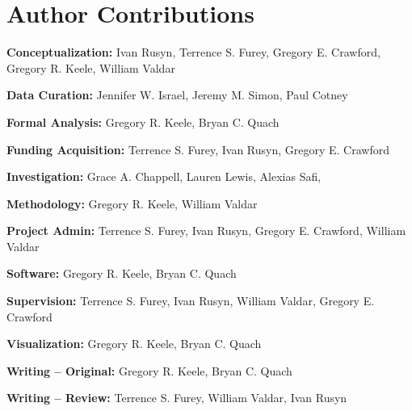 \documentclass[10pt,letterpaper]{article}
\begin{document}
\section*{Author Contributions}

\noindent \textbf{Conceptualization:} Ivan Rusyn, Terrence S. Furey, Gregory E. Crawford, Gregory R. Keele, William Valdar

\noindent \textbf{Data Curation:} Jennifer W. Israel, Jeremy M. Simon, Paul Cotney

\noindent \textbf{Formal Analysis:} Gregory R. Keele, Bryan C. Quach

\noindent \textbf{Funding Acquisition:} Terrence S. Furey, Ivan Rusyn, Gregory E. Crawford

\noindent \textbf{Investigation:} Grace A. Chappell, Lauren Lewis, Alexias Safi,

\noindent \textbf{Methodology:} Gregory R. Keele, William Valdar

\noindent \textbf{Project Admin:} Terrence S. Furey, Ivan Rusyn, Gregory E. Crawford, William Valdar

\noindent \textbf{Software:} Gregory R. Keele, Bryan C. Quach

\noindent \textbf{Supervision:} Terrence S. Furey, Ivan Rusyn, William Valdar, Gregory E. Crawford

\noindent \textbf{Visualization:} Gregory R. Keele, Bryan C. Quach

\noindent \textbf{Writing – Original:} Gregory R. Keele, Bryan C. Quach

\noindent \textbf{Writing – Review:} Terrence S. Furey, William Valdar, Ivan Rusyn
 
\nolinenumbers

%
%
% 
%
\end{document}
